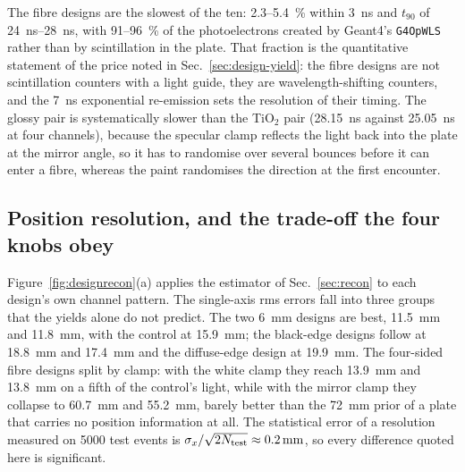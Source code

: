\documentclass[11pt,a4paper]{article}
\newcommand{\gfour}{Geant4}
\begin{document}
The fibre designs are the slowest of the ten: \num{2.3}--\SI{5.4}{\percent}
within \SI{3}{\nano\second} and $t_{90}$ of
\SI{24}{\nano\second}--\SI{28}{\nano\second}, with
\num{91}--\SI{96}{\percent} of the photoelectrons created by
\gfour's \texttt{G4OpWLS} rather than by scintillation in the plate. That
fraction is the quantitative statement of the price noted in
Sec.~\ref{sec:design-yield}: the fibre designs are not scintillation counters
with a light guide, they are wavelength-shifting counters, and the
\SI{7}{\nano\second} exponential re-emission sets the resolution of their
timing. The glossy pair is systematically slower than the TiO$_2$ pair
(\SI{28.15}{\nano\second} against \SI{25.05}{\nano\second} at four
channels), because the specular clamp reflects the light back into the plate
at the mirror angle, so it has to randomise over several bounces before it can
enter a fibre, whereas the paint randomises the direction at the first
encounter.

\subsection{Position resolution, and the trade-off the four knobs obey}
\label{sec:design-recon}

Figure~\ref{fig:designrecon}(a) applies the estimator of
Sec.~\ref{sec:recon} to each design's own channel pattern. The single-axis rms
errors fall into three groups that the yields alone do not predict. The two
\SI{6}{\milli\meter} designs are best, \SI{11.5}{\milli\meter} and
\SI{11.8}{\milli\meter}, with the control at \SI{15.9}{\milli\meter}; the
black-edge designs follow at \SI{18.8}{\milli\meter} and
\SI{17.4}{\milli\meter} and the diffuse-edge design at
\SI{19.9}{\milli\meter}. The four-sided fibre designs split by clamp: with the
white clamp they reach \SI{13.9}{\milli\meter} and
\SI{13.8}{\milli\meter} on a fifth of the control's light, while with the
mirror clamp they collapse to \SI{60.7}{\milli\meter} and
\SI{55.2}{\milli\meter}, barely better than the \SI{72}{\milli\meter} prior of
a plate that carries no position information at all. The statistical error of a
resolution measured on \num{5000} test events is
$\sigma_x/\sqrt{2N_{\rm test}}\approx\SI{0.2}{\milli\meter}$, so every
difference quoted here is significant.
\end{document}
